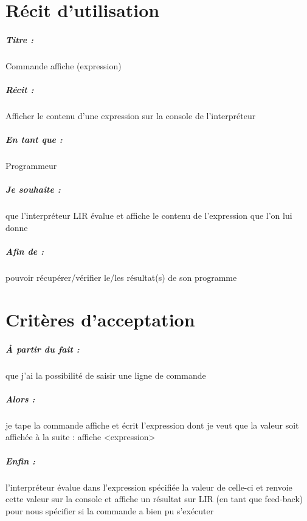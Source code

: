 \documentclass[12pt,a5paper, notitle, oneside]{report}
\begin{document}
	
	\chapter*{Récit d'utilisation}
	
	\paragraph{Titre : } Commande affiche (expression)
	\paragraph{Récit : }  Afficher le contenu d'une expression sur la console de l'interpréteur
	\paragraph{En tant que : } Programmeur
	\paragraph{Je souhaite : } que l'interpréteur LIR évalue et affiche le contenu de l'expression que l'on lui donne
	\paragraph{Afin de : } pouvoir récupérer/vérifier le/les résultat(s) de son programme 
	\newpage
	
	\chapter*{Critères d'acceptation}
	
	\paragraph{À partir du fait : } que j'ai la possibilité de saisir une ligne de commande
	\paragraph{Alors : } je tape la commande affiche et écrit l'expression dont je veut que la valeur soit affichée à la suite : affiche <expression>
	\paragraph{Enfin : } l'interpréteur évalue dans l'expression spécifiée la valeur de celle-ci et renvoie cette valeur sur la console et affiche un résultat sur LIR (en tant que feed-back) pour nous spécifier si la commande a bien pu s'exécuter
	
\end{document}
